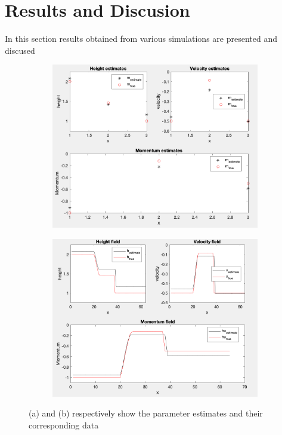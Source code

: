 \documentclass[12pt,a4paper]{article}
\begin{document}
	\section{ Results and Discusion}
	In this section results obtained from various simulations are presented and discused
	\begin{figure}[H]
	\begin{subfigure}[b]{0.5\textwidth}
		\centering
		\includegraphics[width=1.0\linewidth]{estimates_15}
		\caption{}
		\label{fig:exap}
	\end{subfigure}
	\begin{subfigure}[b]{0.517\textwidth}
		\centering
		\includegraphics[width=1.0\linewidth]{field_15}
		\caption{}
		\label{fig:exapp}
	\end{subfigure}
	\caption{(a) and (b) respectively show the parameter estimates and their corresponding data}
\end{figure}
\end{document}
